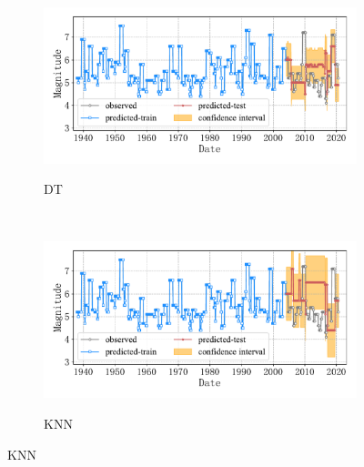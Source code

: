 \begin{figure}[!htbp]
\begin{subfigure}[b]{0.45\textwidth}
    \vspace{-1cm}
    \label{fig:seism_gbr_minyear_1932_maxyear_2021_spanlat_2_spanlon_4_timewindow_72_nextmonth_12_minmag_3.0_blocks1}
  \end{subfigure}
  ~
  \begin{subfigure}[b]{0.45\textwidth}
    \caption{DT}
    \vspace{-0.2cm}
    \includegraphics[width=\textwidth]{Img/chap5_seism/total/seism_dt_minyear_1932_maxyear_2021_spanlat_2_spanlon_4_timewindow_72_nextmonth_12_minmag_3.0_blocks1.pdf}
    \vspace{-1cm}
    \label{fig:seism_dt_minyear_1932_maxyear_2021_spanlat_2_spanlon_4_timewindow_72_nextmonth_12_minmag_3.0_blocks1}
  \end{subfigure}
  \\
  \begin{subfigure}[b]{0.45\textwidth}
    \caption{KNN}
    \vspace{-0.2cm}
    \includegraphics[width=\textwidth]{Img/chap5_seism/total/seism_kn_minyear_1932_maxyear_2021_spanlat_2_spanlon_4_timewindow_72_nextmonth_12_minmag_3.0_blocks1.pdf}
    \vspace{-1cm}
    \label{fig:seism_knn_minyear_1932_maxyear_2021_spanlat_2_spanlon_4_timewindow_72_nextmonth_12_minmag_3.0_blocks1}

\end{subfigure}
\end{figure}
